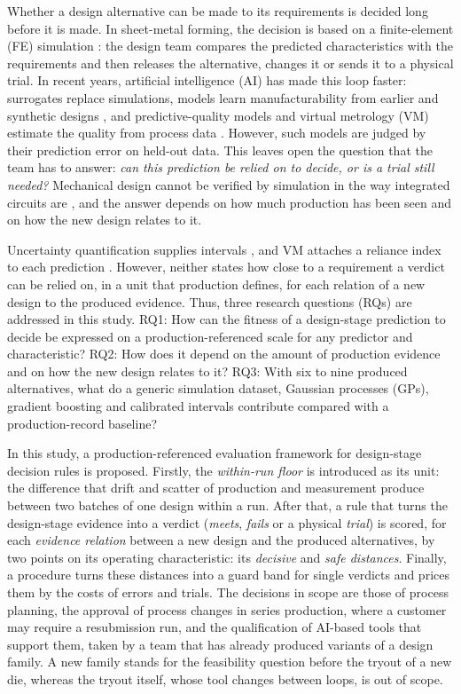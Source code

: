 \documentclass[pdflatex,sn-basic,lineno]{sn-jnl}
\begin{document}
Whether a design alternative can be made to its requirements is decided long before it is made. In sheet-metal forming, the decision is based on a finite-element (FE) simulation \citep{banabic2010sheet}: the design team compares the predicted characteristics with the requirements and then releases the alternative, changes it or sends it to a physical trial. In recent years, artificial intelligence (AI) has made this loop faster: surrogates replace simulations, models learn manufacturability from earlier and synthetic designs \citep{yan2026machine, ghadai2018learning, ballegeer2026bendfm}, and predictive-quality models and virtual metrology (VM) estimate the quality from process data \citep{tercan2022machine, dreyfus2022virtual}. However, such models are judged by their prediction error on held-out data. This leaves open the question that the team has to answer: \emph{can this prediction be relied on to decide, or is a trial still needed?} Mechanical design cannot be verified by simulation in the way integrated circuits are \citep{whitney1996why}, and the answer depends on how much production has been seen and on how the new design relates to it.

Uncertainty quantification supplies intervals \citep{nemani2023uncertainty}, and VM attaches a reliance index to each prediction \citep{cheng2008evaluating}. However, neither states how close to a requirement a verdict can be relied on, in a unit that production defines, for each relation of a new design to the produced evidence. Thus, three research questions (RQs) are addressed in this study. RQ1: How can the fitness of a design-stage prediction to decide be expressed on a production-referenced scale for any predictor and characteristic? RQ2: How does it depend on the amount of production evidence and on how the new design relates to it? RQ3: With six to nine produced alternatives, what do a generic simulation dataset, Gaussian processes (GPs), gradient boosting and calibrated intervals contribute compared with a production-record baseline?

In this study, a production-referenced evaluation framework for design-stage decision rules is proposed. Firstly, the \emph{within-run floor} is introduced as its unit: the difference that drift and scatter of production and measurement produce between two batches of one design within a run. After that, a rule that turns the design-stage evidence into a verdict (\emph{meets}, \emph{fails} or a physical \emph{trial}) is scored, for each \emph{evidence relation} between a new design and the produced alternatives, by two points on its operating characteristic: its \emph{decisive} and \emph{safe distances}. Finally, a procedure turns these distances into a guard band for single verdicts and prices them by the costs of errors and trials. The decisions in scope are those of process planning, the approval of process changes in series production, where a customer may require a resubmission run, and the qualification of AI-based tools that support them, taken by a team that has already produced variants of a design family. A new family stands for the feasibility question before the tryout of a new die, whereas the tryout itself, whose tool changes between loops, is out of scope.
\end{document}
